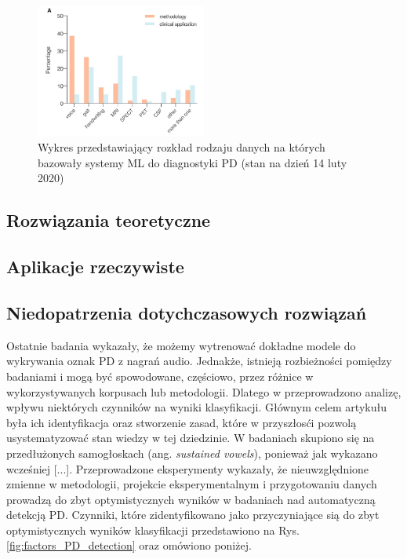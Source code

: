 \begin{figure}[htbp]
	\centering
	\includegraphics[width=0.5\textwidth]{./img/plot_PD_detection_methods}
	\caption{Wykres przedstawiający rozkład rodzaju danych na których bazowały systemy ML do diagnostyki PD\cite{ML_for_PD_review} (stan na dzień 14 luty 2020)}
    \label{fig:pd_detection_methods}
\end{figure}


\subsection{Rozwiązania teoretyczne}
\label{subsec:rozwiazania-teoretyczne}

\subsection{Aplikacje rzeczywiste}
\label{subsec:aplikacje}


\subsection{Niedopatrzenia dotychczasowych rozwiązań}
\label{subsec:wady_rozwiazan}

Ostatnie badania wykazały, że możemy wytrenować dokładne modele do wykrywania oznak PD z nagrań audio.
Jednakże, istnieją rozbieżności pomiędzy badaniami i mogą być spowodowane, częściowo, przez różnice w
wykorzystywanych korpusach lub metodologii.
Dlatego w  \cite{SustainedVowelsProblems} przeprowadzono analizę, wpływu niektórych czynników na wyniki klasyfikacji.
Głównym celem artykułu była ich identyfikacja oraz stworzenie zasad, które w przyszłosći pozwolą usystematyzować
stan wiedzy w tej dziedzinie.
W badaniach skupiono się na przedłużonych samogłoskach (ang. \emph{sustained vowels}), ponieważ jak wykazano wcześniej
[...].
Przeprowadzone eksperymenty wykazały, że nieuwzględnione zmienne w metodologii, projekcie eksperymentalnym i
przygotowaniu danych prowadzą do zbyt optymistycznych wyników w badaniach nad automatyczną detekcją PD.
Czynniki, które zidentyfikowano jako przyczyniające sią do zbyt optymistycznych wyników klasyfikacji
przedstawiono na Rys. \ref{fig:factors_PD_detection} oraz omówiono poniżej.


